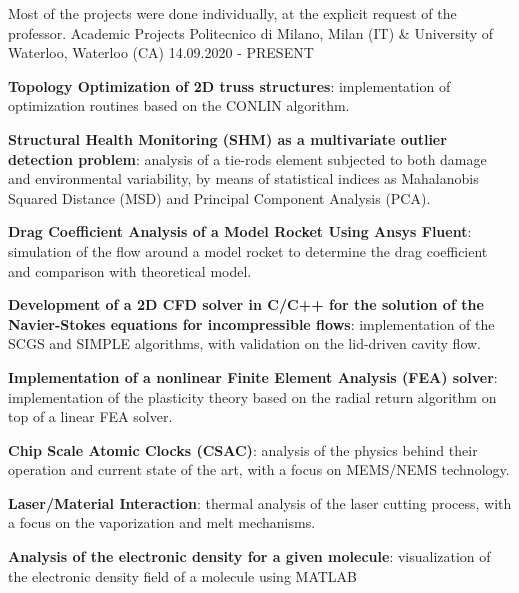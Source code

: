 

\begin{cventries}

  \cventry
  {Most of the projects were done individually, at the explicit request of the professor.}
  {Academic Projects}
  {Politecnico di Milano, Milan (IT) \& University of Waterloo, Waterloo (CA)}
  {14.09.2020 - PRESENT}
  {
    \begin{cvitems}
      \item {\textbf{Topology Optimization of 2D truss structures}: implementation of optimization routines based on the CONLIN algorithm.}
      \item {\textbf{Structural Health Monitoring (SHM) as a multivariate outlier detection problem}: analysis of a tie-rods element subjected to both damage and environmental variability, by means of statistical indices as Mahalanobis Squared Distance (MSD) and Principal Component Analysis (PCA).}
      \item {\textbf{Drag Coefficient Analysis of a Model Rocket Using Ansys Fluent}: simulation of the flow around a model rocket to determine the drag coefficient and comparison with theoretical model.}
      \item {\textbf{Development of a 2D CFD solver in C/C++ for the solution of the Navier-Stokes equations for incompressible flows}: implementation of the SCGS and SIMPLE algorithms, with validation on the lid-driven cavity flow.}
      \item {\textbf{Implementation of a nonlinear Finite Element Analysis (FEA) solver}: implementation of the plasticity theory based on the radial return algorithm on top of a linear FEA solver.}
      \item {\textbf{Chip Scale Atomic Clocks (CSAC)}: analysis of the physics behind their operation and current state of the art, with a focus on MEMS/NEMS technology.}
      \item {\textbf{Laser/Material Interaction}: thermal analysis of the laser cutting process, with a focus on the vaporization and melt mechanisms.}
      \item {\textbf{Analysis of the electronic density for a given molecule}: visualization of the electronic density field of a molecule using MATLAB}
    \end{cvitems}
  }


\end{cventries}
